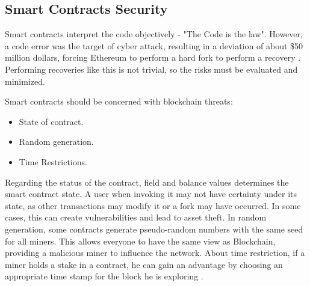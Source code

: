\subsection{Smart Contracts Security}\label{sec:seguranca}
Smart contracts interpret the code objectively - "The Code is the law". However, a code error was the target of cyber attack, resulting in a deviation of about \$50 million dollars, forcing Ethereum to perform a hard fork to perform a recovery \cite{bashir2018mastering}. Performing recoveries like this is not trivial, so the risks must be evaluated and minimized.

Smart contracts should be concerned with blockchain threats:
\begin{itemize}
\item State of contract.
\item Random generation.
\item Time Restrictions.
\end{itemize}

Regarding the status of the contract, field and balance values determines the smart contract state. A user when invoking it may not have certainty under its state, as other transactions may modify it or a fork may have occurred. In some cases, this can create vulnerabilities and lead to asset theft. In random generation, some contracts generate pseudo-random numbers with the same seed for all miners. This allows everyone to have the same view as Blockchain, providing
a malicious miner to influence the network. About time restriction, if a miner holds a stake in a contract, he can gain an advantage by choosing an appropriate time stamp for the block he is exploring \cite{greve2018blockchain}.